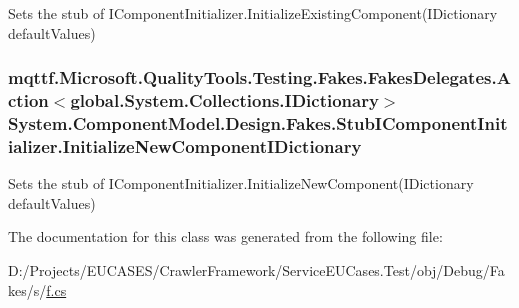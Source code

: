 Sets the stub of I\-Component\-Initializer.\-Initialize\-Existing\-Component(\-I\-Dictionary default\-Values)

\hypertarget{class_system_1_1_component_model_1_1_design_1_1_fakes_1_1_stub_i_component_initializer_a7d216d809899aaa5624d4f4d1bb0061f}{
\subsubsection[{Initialize\-New\-Component\-I\-Dictionary}]{\setlength{\rightskip}{0pt plus 5cm}mqttf.\-Microsoft.\-Quality\-Tools.\-Testing.\-Fakes.\-Fakes\-Delegates.\-Action$<$global.\-System.\-Collections.\-I\-Dictionary$>$ System.\-Component\-Model.\-Design.\-Fakes.\-Stub\-I\-Component\-Initializer.\-Initialize\-New\-Component\-I\-Dictionary}}\label{class_system_1_1_component_model_1_1_design_1_1_fakes_1_1_stub_i_component_initializer_a7d216d809899aaa5624d4f4d1bb0061f}


Sets the stub of I\-Component\-Initializer.\-Initialize\-New\-Component(\-I\-Dictionary default\-Values)



The documentation for this class was generated from the following file\-:\begin{DoxyCompactItemize}
\item 
D\-:/\-Projects/\-E\-U\-C\-A\-S\-E\-S/\-Crawler\-Framework/\-Service\-E\-U\-Cases.\-Test/obj/\-Debug/\-Fakes/s/\hyperlink{s_2f_8cs}{f.\-cs}\end{DoxyCompactItemize}
